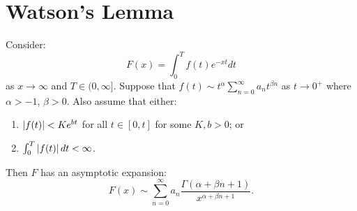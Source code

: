 \documentclass[../Main.tex]{subfiles}
\begin{document}
\section{Watson's Lemma}
\begin{theorem}
    Consider:
    \begin{equation*}
        F(x) = \int_{0}^{T} f(t)e^{-xt} dt
    \end{equation*}
    as $x \to \infty$ and $T \in (0, \infty]$. Suppose that $f(t) \sim t^\alpha \sum_{n=0}^{\infty} a_n t^{\beta n}$ as $t \to 0^+$ where $\alpha > -1$, $\beta > 0$. Also assume that either:
    \begin{enumerate}
        \item $\left|f(t)\right| < Ke^{bt}$ for all $t \in [0, t]$ for some $K, b > 0$; or
        \item $\int_{0}^{T} \left|f(t)\right| dt < \infty$.
    \end{enumerate}

    Then $F$ has an asymptotic expansion:
    \begin{equation*}
        F(x) \sim \sum_{n=0}^{\infty} a_n \frac{\Gamma(\alpha + \beta n + 1)}{x^{\alpha + \beta n + 1}}.
    \end{equation*}
    \label{thmWatsonLemma}
\end{theorem}
\end{document}
